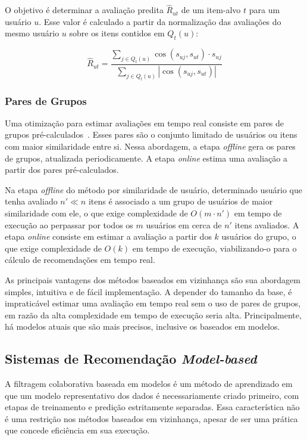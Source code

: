 O objetivo é determinar a avaliação predita $\hat{R}_{ut}$ de um item-alvo $t$ para um usuário
$u$. Esse valor é calculado a partir da normalização das avaliações do mesmo
usuário $u$ sobre os itens contidos em $Q_t (u)$:

\begin{equation}
    \hat{R}_{ut} = \frac{\sum_{j \in Q_t(u)} \cos(s_{uj},s_{ut}) \cdot s_{uj}}{\sum_{j \in Q_t(u)} |\cos(s_{uj},s_{ut})|}
\end{equation}

\subsubsection{Pares de Grupos}

Uma otimização para estimar avaliações em tempo real consiste em pares de grupos
pré-calculados~\cite{aggarwal2016recommender}. Esses pares são o conjunto limitado de usuários ou itens com
maior similaridade entre si. Nessa abordagem, a etapa \textit{offline} gera os
pares de grupos, atualizada periodicamente. A etapa \textit{online} estima uma
avaliação a partir dos pares pré-calculados.

Na etapa \textit{offline} do método por similaridade de usuário, determinado
usuário que tenha avaliado $n' \ll n$ itens é associado a um grupo de usuários
de maior similaridade com ele, o que exige complexidade de $O(m \cdot n')$ em
tempo de execução ao perpassar por todos os $m$ usuários em cerca de $n'$ itens
avaliados. A etapa \textit{online} consiste em estimar a avaliação a partir dos
$k$ usuários do grupo, o que exige complexidade de $O(k)$ em tempo de execução,
viabilizando-o para o cálculo de recomendações em tempo real.
 
As principais vantagens dos métodos baseados em vizinhança são sua abordagem
simples, intuitiva e de fácil implementação. A depender do tamanho da base, é
impraticável estimar uma avaliação em tempo real sem o uso de pares de grupos,
em razão da alta complexidade em tempo de execução seria alta. Principalmente,
há modelos atuais que são mais precisos, inclusive os baseados em modelos.

\subsection{Sistemas de Recomendação \textit{Model-based}}
A filtragem colaborativa baseada em modelos é um método de aprendizado em que um
modelo representativo dos dados é necessariamente criado primeiro, com etapas de
treinamento e predição estritamente separadas. Essa característica  não é uma
restrição nos métodos baseados em vizinhança, apesar de ser uma prática que
concede eficiência em sua execução.

